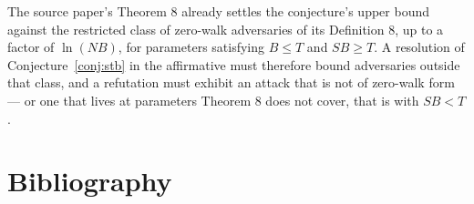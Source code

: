 \documentclass{aicr-conjecture}
\begin{document}
\begin{remark}\label{rem:zerowalk}
The source paper's Theorem 8 already settles the conjecture's upper
bound against the restricted class of zero-walk adversaries of its
Definition 8, up to a factor of $\ln(NB)$, for parameters satisfying
$B \le T$ and $SB \ge T$. A resolution of Conjecture~\ref{conj:stb} in
the affirmative must therefore bound adversaries outside that class, and
a refutation must exhibit an attack that is not of zero-walk form ---
or one that lives at parameters Theorem 8 does not cover, that is with
$SB < T$.
\end{remark}

\section{Bibliography}
\end{document}
